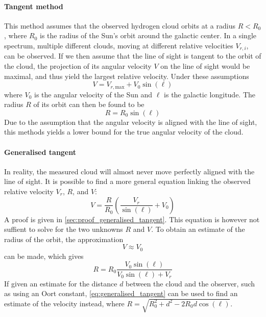 \paragraph{Tangent method}
This method assumes that the observed hydrogen cloud orbits at a radius $R < R_0$, where $R_0$ is the radius of the Sun's orbit around the galactic center. In a single spectrum, multiple different clouds, moving at different relative velocities $V_{r,i}$, can be observed. If we then assume that the line of sight is tangent to the orbit of the cloud, the projection of its angular velocity $V$ on the line of sight would be maximal, and thus yield the largest relative velocity. Under these assumptions
\begin{equation}
    V = V_{r,\textrm{max}} + V_0 \sin(\ell)
\end{equation}
where $V_0$ is the angular velocity of the Sun and $\ell$ is the galactic longitude. The radius $R$ of its orbit can then be found to be
\begin{equation}
    R = R_0 \sin(\ell)
\end{equation}
Due to the assumption that the angular velocity is aligned with the line of sight, this methods yields a lower bound for the true angular velocity of the cloud.

\paragraph{Generalised tangent}
In reality, the measured cloud will almost never move perfectly aligned with the line of sight. It is possible to find a more general equation linking the observed relative velocity $V_r$, $R$, and $V$:
\begin{equation}
    V = \frac{R}{R_0} \left( \frac{V_r}{\sin(\ell)} + V_0 \right)
    \label{eq:generalised_tangent}
\end{equation}
A proof is given in \autoref{sec:proof_generalised_tangent}. This equation is however not suffient to solve for the two unknowns $R$ and $V$. To obtain an estimate of the radius of the orbit, the approximation
\begin{equation*}
    V \approx V_0
\end{equation*}
can be made, which gives
\begin{equation*}
    R = R_0 \frac{V_0 \sin(\ell)}{V_0 \sin(\ell) + V_r}
\end{equation*}
If given an estimate for the distance $d$ between the cloud and the observer, such as using an Oort constant, \autoref{eq:generalised_tangent} can be used to find an estimate of the velocity instead, where $R = \sqrt{R_0^2 + d^2 - 2 R_0 d \cos(\ell)}$.

